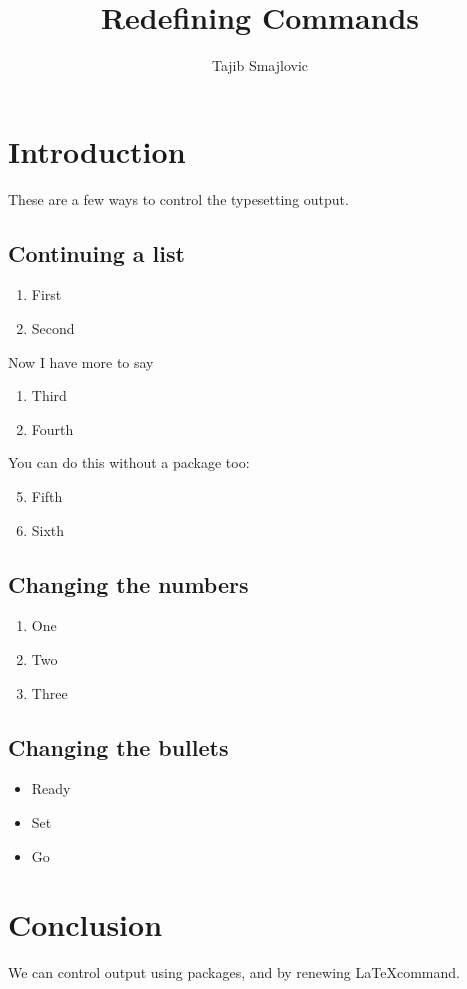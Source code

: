 \documentclass{article}
\title{Redefining Commands}
\author{Tajib Smajlovic}
\date{}
\begin{document}
	
	\maketitle
	
	\section{Introduction}
	These are a few ways to control the typesetting output.
	
	\subsection{Continuing a list}
	\begin{enumerate}
		\item First
		\item Second
	\end{enumerate}
	
	Now I have more to say
	\begin{enumerate}[resume]
		\item Third
		\item Fourth
	\end{enumerate}
	
	You can do this without a package too:
	\begin{enumerate}
		\setcounter{enumi}{4}
		\item Fifth
		\item Sixth
	\end{enumerate}
	
	
	\subsection{Changing the numbers}
	\renewcommand{\theenumi}{\Alph{enumi}}
	\begin{enumerate}
		\item One
		\item Two
		\item Three
	\end{enumerate}
	
	\subsection{Changing the bullets}
	\renewcommand{\labelitemi}{$\rightarrow$}
	\begin{itemize}
		\item Ready
		\item Set
		\item Go
	\end{itemize}
	
	\section{Conclusion}
	We can control output using packages, and by renewing \LaTeX command.
	
\end{document}

